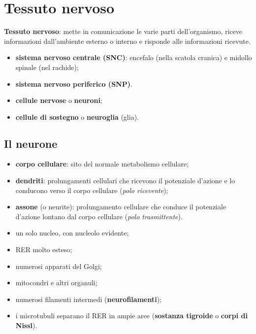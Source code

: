 \section{Tessuto nervoso}

\textbf{Tessuto nervoso}: mette in comunicazione le varie parti dell'organismo, riceve informazioni dall'ambiente esterno o interno e risponde alle informazioni ricevute.

\begin{itemize}
  \item \textbf{sistema nervoso centrale (SNC)}: encefalo (nella scatola cranica) e midollo spinale (nel rachide);
  \item \textbf{sistema nervoso periferico (SNP)}.
\end{itemize}

\begin{itemize}
  \item \textbf{cellule nervose} o \textbf{neuroni};
  \item \textbf{cellule di sostegno} o \textbf{neuroglia} (glia).
\end{itemize}

\subsection{Il neurone}

\begin{itemize}
  \item \textbf{corpo cellulare}: sito del normale metabolismo cellulare;
  \item \textbf{dendriti}: prolungamenti cellulari che ricevono il potenziale d'azione e lo conducono verso il corpo cellulare (\textit{polo ricevente});
  \item \textbf{assone} (o neurite): prolungamento cellulare che conduce il potenziale d'azione lontano dal corpo cellulare (\textit{polo trasmittente}).
\end{itemize}

\begin{itemize}
  \item un solo nucleo, con nucleolo evidente;
  \item RER molto esteso;
  \item numerosi apparati del Golgi;
  \item mitocondri e altri organuli;
  \item numerosi filamenti intermedi (\textbf{neurofilamenti});
  \item i microtubuli separano il RER in ampie aree (\textbf{sostanza tigroide} o \textbf{corpi di Nissl}).
\end{itemize}

